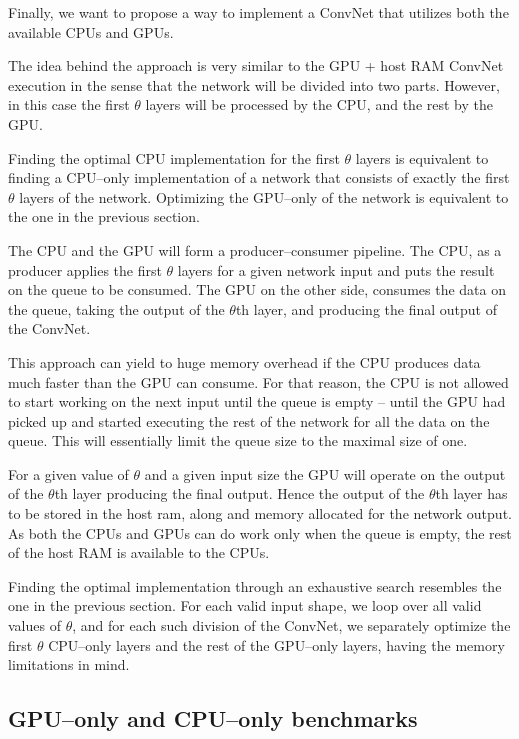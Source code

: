 \documentclass[conference]{./IEEEtran/IEEEtran}
\begin{document}
  Finally, we want to propose a way to implement a ConvNet that
  utilizes both the available CPUs and GPUs.

  The idea behind the approach is very similar to the GPU + host RAM
  ConvNet execution in the sense that the network will be divided into
  two parts.  However, in this case the first $\theta$ layers will be
  processed by the CPU, and the rest by the GPU.

  Finding the optimal CPU implementation for the first $\theta$ layers
  is equivalent to finding a CPU--only implementation of a network
  that consists of exactly the first $\theta$ layers of the network.
  Optimizing the GPU--only of the network is equivalent to the one in
  the previous section.

  The CPU and the GPU will form a producer--consumer pipeline.  The
  CPU, as a producer applies the first $\theta$ layers for a given
  network input and puts the result on the queue to be consumed.  The
  GPU on the other side, consumes the data on the queue, taking the
  output of the $\theta$th layer, and producing the final output of
  the ConvNet.

  This approach can yield to huge memory overhead if the CPU produces
  data much faster than the GPU can consume.  For that reason, the CPU
  is not allowed to start working on the next input until the queue is
  empty -- until the GPU had picked up and started executing the rest
  of the network for all the data on the queue.  This will essentially
  limit the queue size to the maximal size of one.

  For a given value of $\theta$ and a given input size the GPU will
  operate on the output of the $\theta$th layer producing the final
  output.  Hence the output of the $\theta$th layer has to be stored
  in the host ram, along and memory allocated for the network output.
  As both the CPUs and GPUs can do work only when the queue is empty,
  the rest of the host RAM is available to the CPUs.

  Finding the optimal implementation through an exhaustive search
  resembles the one in the previous section.  For each valid input
  shape, we loop over all valid values of $\theta$, and for each such
  division of the ConvNet, we separately optimize the first $\theta$
  CPU--only layers and the rest of the GPU--only layers, having the
  memory limitations in mind.

\subsection{GPU--only and CPU--only benchmarks}
\end{document}
